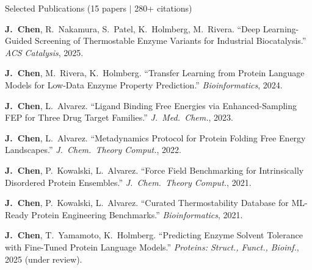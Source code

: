 \documentclass{resume}
\begin{document}
\begin{rSection2}{Selected Publications (15 papers $\vert$ 280+ citations)}

\item \textbf{J.\ Chen}, R.\ Nakamura, S.\ Patel, K.\ Holmberg, M.\ Rivera. ``Deep Learning-Guided Screening of Thermostable Enzyme Variants for Industrial Biocatalysis.'' \textit{ACS Catalysis}, 2025.

\item \textbf{J.\ Chen}, M.\ Rivera, K.\ Holmberg. ``Transfer Learning from Protein Language Models for Low-Data Enzyme Property Prediction.'' \textit{Bioinformatics}, 2024.

\item \textbf{J.\ Chen}, L.\ Alvarez. ``Ligand Binding Free Energies via Enhanced-Sampling FEP for Three Drug Target Families.'' \textit{J.\ Med.\ Chem.}, 2023.

\item \textbf{J.\ Chen}, L.\ Alvarez. ``Metadynamics Protocol for Protein Folding Free Energy Landscapes.'' \textit{J.\ Chem.\ Theory Comput.}, 2022.

\item \textbf{J.\ Chen}, P.\ Kowalski, L.\ Alvarez. ``Force Field Benchmarking for Intrinsically Disordered Protein Ensembles.'' \textit{J.\ Chem.\ Theory Comput.}, 2021.

\item \textbf{J.\ Chen}, P.\ Kowalski, L.\ Alvarez. ``Curated Thermostability Database for ML-Ready Protein Engineering Benchmarks.'' \textit{Bioinformatics}, 2021.

\item \textbf{J.\ Chen}, T.\ Yamamoto, K.\ Holmberg. ``Predicting Enzyme Solvent Tolerance with Fine-Tuned Protein Language Models.'' \textit{Proteins: Struct., Funct., Bioinf.}, 2025 (under review).

\end{rSection2}
\vspace{-0.15cm}
\end{document}
